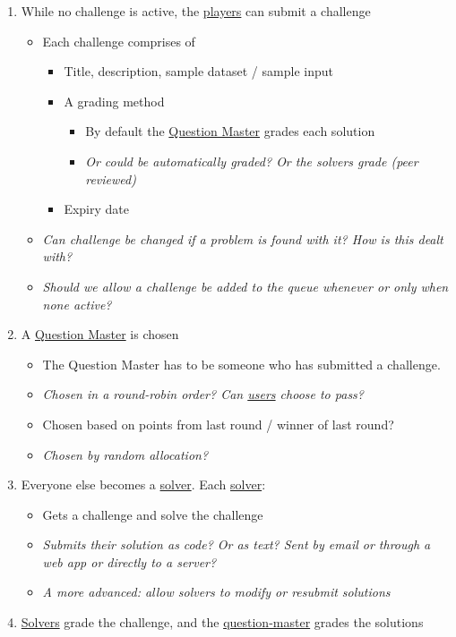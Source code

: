 \documentclass{report}
\begin{document}
\begin{enumerate}
\item While no challenge is active, the \underline{players} can submit a challenge
\begin{itemize}
\item Each challenge comprises of
\begin{itemize}
\item Title, description, sample dataset / sample input
\item A grading method
\begin{itemize}
\item By default the \underline{Question Master} grades each solution
\item \emph{Or could be automatically graded? Or the solvers grade (peer reviewed)}
\end{itemize}
\item Expiry date
\end{itemize}
\item \emph{Can challenge be changed if a problem is found with it? How is this dealt with?}
\item \emph{Should we allow a challenge be added to the queue whenever or only when none active?}
\end{itemize}
\item A \underline{Question Master} is chosen
\begin{itemize}
\item The Question Master has to be someone who has submitted a challenge.
\item \emph{Chosen in a round-robin order? Can \underline{users} choose to pass?}
\item Chosen based on points from last round / winner of last round?
\item \emph{Chosen by random allocation?}
\end{itemize}
\item Everyone else becomes a \underline{solver}. Each \underline{solver}:
\begin{itemize}
\item Gets a challenge and solve the challenge
\item \emph{Submits their solution as code? Or as text? Sent by email or through a web app or directly to a server?}
\item \emph{A more advanced: allow solvers to modify or resubmit solutions}
\end{itemize}
\item \underline{Solvers} grade the challenge, and the \underline{question-master} grades the solutions

\end{enumerate}
\end{document}
